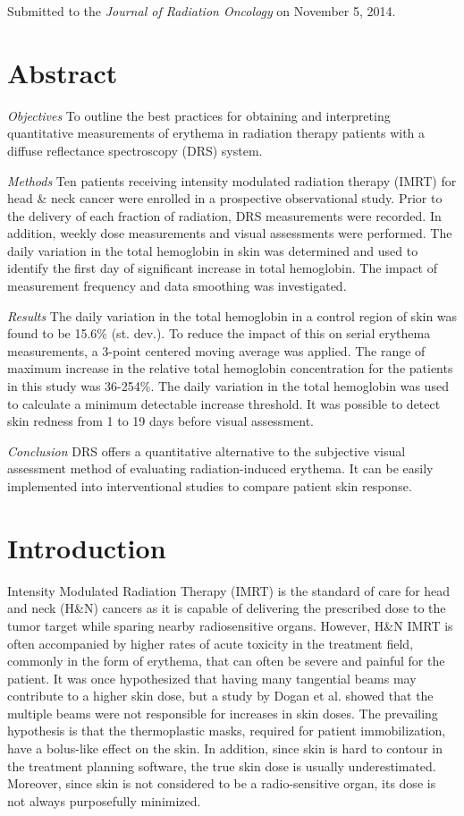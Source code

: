 \noindent Submitted to the \textit{Journal of Radiation Oncology} on November 5, 2014.

\section*{Abstract}
\noindent \emph{Objectives} To outline the best practices for obtaining and interpreting quantitative measurements of erythema in radiation therapy patients with a diffuse reflectance spectroscopy (DRS) system.

\noindent \emph{Methods} Ten patients receiving intensity modulated radiation therapy (IMRT) for head \& neck cancer were enrolled in a prospective observational study. Prior to the delivery of each fraction of radiation, DRS measurements were recorded. In addition, weekly dose measurements and visual assessments were performed. The daily variation in the total hemoglobin in skin was determined and used to identify the first day of significant increase in total hemoglobin. The impact of measurement frequency and data smoothing was investigated.

\noindent \emph{Results} The daily variation in the total hemoglobin in a control region of skin was found to be 15.6\% (st. dev.). To reduce the impact of this on serial erythema measurements, a 3-point centered moving average was applied. The range of maximum increase in the relative total hemoglobin concentration for the patients in this study was 36-254\%. The daily variation in the total hemoglobin was used to calculate a minimum detectable increase threshold. It was possible to detect skin redness from 1 to 19 days before visual assessment.

\noindent \emph{Conclusion} DRS offers a quantitative alternative to the subjective visual assessment method of evaluating radiation-induced erythema. It can be easily implemented into interventional studies to compare patient skin response.

\section{Introduction}
Intensity Modulated Radiation Therapy (IMRT) is the standard of care for head and neck (H\&N) cancers as it is capable of delivering the prescribed dose to the tumor target while sparing nearby radiosensitive organs.\cite{Lee2007} However, H\&N IMRT is often accompanied by higher rates of acute toxicity in the treatment field, commonly in the form of erythema, that can often be severe and painful for the patient.\cite{DeConno1991} It was once hypothesized that having many tangential beams may contribute to a higher skin dose, but a study by Dogan et al. showed that the multiple beams were not responsible for increases in skin doses.\cite{Dogan2003} The prevailing hypothesis is that the thermoplastic masks, required for patient immobilization, have a bolus-like effect on the skin.\cite{Lee2002} In addition, since skin is hard to contour in the treatment planning software, the true skin dose is usually underestimated.\cite{Court2008} Moreover, since skin is not considered to be a radio-sensitive organ, its dose is not always purposefully minimized.\cite{Saibishkumar2008}

